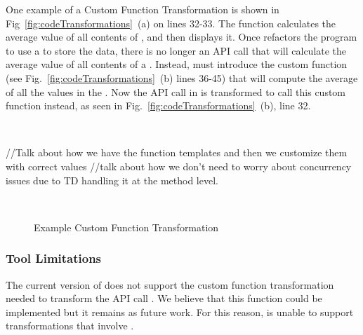 \documentclass[preprint]{sigplanconf}
\begin{document}
One example of a Custom Function Transformation is shown in Fig~\ref{fig:codeTransformations}~(a) on lines 32-33.
The function  calculates the average value of all contents of , and then displays it. 
Once \tool refactors the program to use a \CDT to store the data, there is no longer an API call that will calculate the average value 
of all contents of a \CDT. Instead, \tool must introduce the custom function  (see Fig.~\ref{fig:codeTransformations}~(b) lines 36-45) that will compute the average of all the values in the .  
Now the API call in  is transformed to call this  custom function instead, as seen in Fig.~\ref{fig:codeTransformations}~(b), line 32.

 \\

//Talk about how we have the function templates and then we customize them with correct values
//talk about how we don't need to worry about concurrency issues due to TD handling it at the method level.


\begin{figure}
   \centering
    \mbox{
      \hspace{0.2in}
    }
    \caption{Example Custom Function Transformation}
    \label{fig:MaxCustomTransformationTransformations}
\end{figure}


\subsubsection{Tool Limitations}
The current version of \tool does not support the custom function transformation needed to transform the API call .  We believe that this function could be implemented but it remains as future work.  For this reason,  \tool is unable to support transformations that involve .
\end{document}
